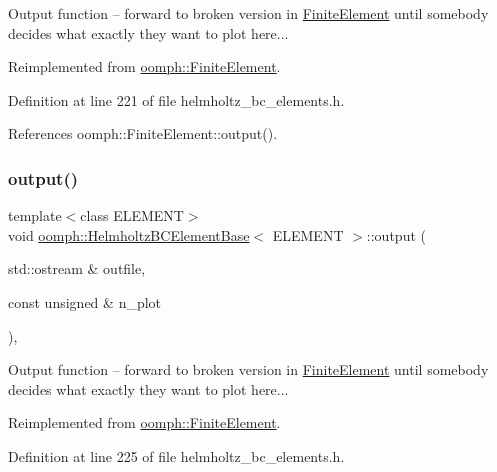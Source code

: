 Output function -- forward to broken version in \hyperlink{classoomph_1_1FiniteElement}{Finite\+Element} until somebody decides what exactly they want to plot here... 

Reimplemented from \hyperlink{classoomph_1_1FiniteElement_a2ad98a3d2ef4999f1bef62c0ff13f2a7}{oomph\+::\+Finite\+Element}.



Definition at line 221 of file helmholtz\+\_\+bc\+\_\+elements.\+h.



References oomph\+::\+Finite\+Element\+::output().

\mbox{\label{classoomph_1_1HelmholtzBCElementBase_a10eda724d26f4b2e10b914cba57c8339}} 
\subsubsection{\texorpdfstring{output()}{output()}\hspace{0.1cm}{\footnotesize\ttfamily [2/4]}}
{\footnotesize\ttfamily template$<$class E\+L\+E\+M\+E\+NT$>$ \\
void \hyperlink{classoomph_1_1HelmholtzBCElementBase}{oomph\+::\+Helmholtz\+B\+C\+Element\+Base}$<$ E\+L\+E\+M\+E\+NT $>$\+::output (\begin{DoxyParamCaption}\item[{std\+::ostream \&}]{outfile,  }\item[{const unsigned \&}]{n\+\_\+plot }\end{DoxyParamCaption})\hspace{0.3cm}{\ttfamily [inline]}, {\ttfamily [virtual]}}



Output function -- forward to broken version in \hyperlink{classoomph_1_1FiniteElement}{Finite\+Element} until somebody decides what exactly they want to plot here... 



Reimplemented from \hyperlink{classoomph_1_1FiniteElement_afa9d9b2670f999b43e6679c9dd28c457}{oomph\+::\+Finite\+Element}.



Definition at line 225 of file helmholtz\+\_\+bc\+\_\+elements.\+h.



